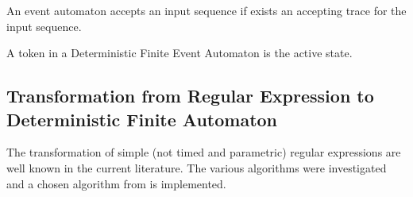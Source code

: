 	\begin{dfn}
		\label{dfn:cep:nea:accepting}
		An event automaton accepts an input sequence if exists an accepting trace for the input sequence.
	\end{dfn}
	
	\begin{dfn}
		\label{dfn:cep:nea:token}
		A token in a Deterministic Finite Event Automaton is the active state.
	\end{dfn}
	
	\subsection{Transformation from Regular Expression to Deterministic Finite Automaton}
		
		The transformation of simple (not timed and parametric) regular expressions are well known in the current literature. The various algorithms were investigated and a chosen algorithm from \citep{lam2006compilers} is implemented.

		
